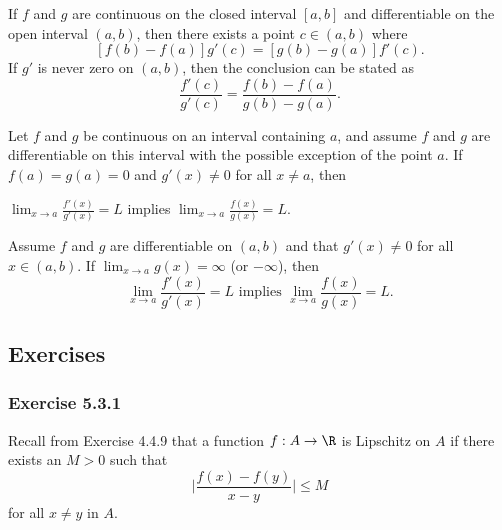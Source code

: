 \begin{tcolorbox}
    \begin{thm}
    If \( f  \) and \( g  \) are continuous on the closed interval \( [a,b]  \) and differentiable on the open interval \( (a,b)  \), then there exists a point \( c \in (a,b)  \) where 
    \[  [f(b) -f(a)]g'(c) = [g(b) -g(a)]f'(c). \]
    If \( g'  \) is never zero on \( (a,b)  \), then the conclusion can be stated as 
    \[  \frac{ f'(c)  }{ g'(c)  } = \frac{ f(b) - f(a)  }{ g(b) - g(a)  }. \]
    \end{thm}
\end{tcolorbox}

\begin{tcolorbox}
    \begin{thm}
    Let \( f  \) and \( g  \) be continuous on an interval containing \( a  \), and assume \( f  \) and \( g  \) are differentiable on this interval with the possible exception of the point \( a  \). If \( f(a) = g(a) = 0  \) and \( g'(x) \neq 0  \) for all \( x \neq a  \), then 
    \begin{center}
        \( \lim_{ x \to a } \frac{ f'(x)  }{ g'(x)  } = L  \) implies \( \lim_{ x \to a } \frac{ f(x)  }{ g(x)  } = L. \)
    \end{center}
    \end{thm}
\end{tcolorbox}

\begin{tcolorbox}
    \begin{thm}
    Assume \( f  \) and \( g  \) are differentiable on \( (a,b)  \) and that \( g'(x) \neq 0  \) for all \( x \in (a,b) \). If \( \lim_{ x \to a } g(x) = \infty  \) (or \( - \infty  \)), then 
    \[  \lim_{ x \to a } \frac{ f'(x)  }{ g'(x)  } = L \text{~implies~} \lim_{ x \to a } \frac{ f(x)  }{ g(x)  } = L. \]
    \end{thm}
\end{tcolorbox}


\subsection{Exercises}

\subsubsection{Exercise 5.3.1} Recall from Exercise 4.4.9 that a function \( f: A \to \R  \) is Lipschitz on \( A  \) if there exists an \( M > 0  \) such that 
\[  \Big| \frac{ f(x) - f(y)  }{ x - y  }   \Big| \leq M     \] for all \( x \neq y  \) in \( A  \).

